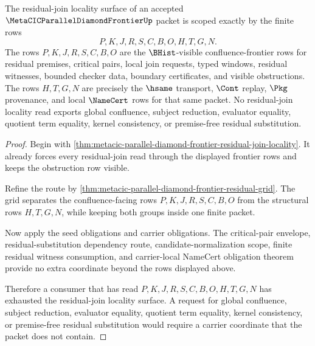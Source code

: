 \begin{theorem}
\label{thm:metacic-parallel-diamond-frontier-residual-join-locality-scope}
The residual-join locality surface of an accepted $\MetaCICParallelDiamondFrontierUp$ packet is scoped exactly by the finite rows
$$
P,K,J,R,S,C,B,O,H,T,G,N .
$$
The rows $P,K,J,R,S,C,B,O$ are the $\BHist$-visible confluence-frontier rows for residual premises, critical pairs, local join requests, typed windows, residual witnesses, bounded checker data, boundary certificates, and visible obstructions. The rows $H,T,G,N$ are precisely the $\hsame$ transport, $\Cont$ replay, $\Pkg$ provenance, and local $\NameCert$ rows for that same packet. No residual-join locality read exports global confluence, subject reduction, evaluator equality, quotient term equality, kernel consistency, or premise-free residual substitution.
\end{theorem}
\begin{proof}
Begin with \autoref{thm:metacic-parallel-diamond-frontier-residual-join-locality}. It already forces every residual-join read through the displayed frontier rows and keeps the obstruction row visible.

Refine the route by \autoref{thm:metacic-parallel-diamond-frontier-residual-grid}. The grid separates the confluence-facing rows $P,K,J,R,S,C,B,O$ from the structural rows $H,T,G,N$, while keeping both groups inside one finite packet.

Now apply the seed obligations and carrier obligations. The critical-pair envelope, residual-substitution dependency route, candidate-normalization scope, finite residual witness consumption, and carrier-local NameCert obligation theorem provide no extra coordinate beyond the rows displayed above.

Therefore a consumer that has read $P,K,J,R,S,C,B,O,H,T,G,N$ has exhausted the residual-join locality surface. A request for global confluence, subject reduction, evaluator equality, quotient term equality, kernel consistency, or premise-free residual substitution would require a carrier coordinate that the packet does not contain.
\end{proof}

